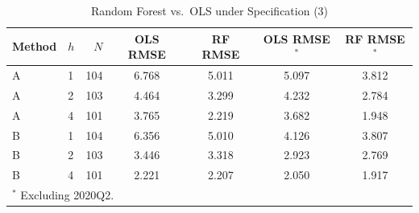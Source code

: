 \begin{table}[htbp]
\centering
\caption{Random Forest vs.\ OLS under Specification (3)}
\label{tab:rf_vs_ols}
\footnotesize
\begin{tabular}{llrcccc}
\toprule
Method & $h$ & $N$ & OLS RMSE & RF RMSE & OLS RMSE$^*$ & RF RMSE$^*$ \\
\midrule
  A & 1 & 104 & 6.768 & 5.011 & 5.097 & 3.812 \\
  A & 2 & 103 & 4.464 & 3.299 & 4.232 & 2.784 \\
  A & 4 & 101 & 3.765 & 2.219 & 3.682 & 1.948 \\
  B & 1 & 104 & 6.356 & 5.010 & 4.126 & 3.807 \\
  B & 2 & 103 & 3.446 & 3.318 & 2.923 & 2.769 \\
  B & 4 & 101 & 2.221 & 2.207 & 2.050 & 1.917 \\
\bottomrule
\multicolumn{7}{l}{\footnotesize $^*$ Excluding 2020Q2.} \\
\end{tabular}
\end{table}